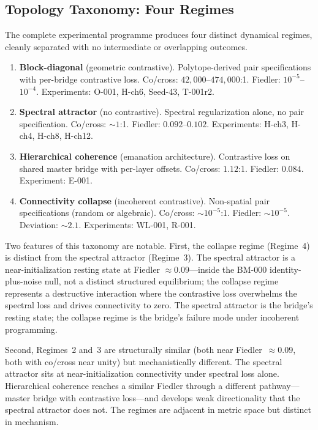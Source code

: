 \subsection{Topology Taxonomy: Four Regimes}

The complete experimental programme produces four distinct dynamical
regimes, cleanly separated with no intermediate or overlapping
outcomes.

\begin{enumerate}
  \item \textbf{Block-diagonal} (geometric contrastive).
    Polytope-derived pair specifications with per-bridge contrastive
    loss. Co/cross: $42{,}000$--$474{,}000$:1. Fiedler: $10^{-5}$--$10^{-4}$.
    Experiments: O-001, H-ch6, Seed-43, T-001r2.

  \item \textbf{Spectral attractor} (no contrastive).
    Spectral regularization alone, no pair specification.
    Co/cross: ${\sim}1$:1. Fiedler: $0.092$--$0.102$.
    Experiments: H-ch3, H-ch4, H-ch8, H-ch12.

  \item \textbf{Hierarchical coherence} (emanation architecture).
    Contrastive loss on shared master bridge with per-layer offsets.
    Co/cross: $1.12$:1. Fiedler: $0.084$.
    Experiment: E-001.

  \item \textbf{Connectivity collapse} (incoherent contrastive).
    Non-spatial pair specifications (random or algebraic).
    Co/cross: ${\sim}10^{-5}$:1. Fiedler: ${\sim}10^{-5}$.
    Deviation: ${\sim}2.1$.
    Experiments: WL-001, R-001.
\end{enumerate}

Two features of this taxonomy are notable. First, the collapse regime
(Regime~4) is distinct from the spectral attractor (Regime~3). The
spectral attractor is a near-initialization resting state at Fiedler
$\approx 0.09$---inside the BM-000 identity-plus-noise null, not a
distinct structured equilibrium; the collapse regime represents a
destructive interaction where the contrastive loss overwhelms the
spectral loss and drives connectivity to zero. The spectral attractor
is the bridge's resting state; the collapse regime is the bridge's
failure mode under incoherent programming.

Second, Regimes~2 and~3 are structurally similar (both near
Fiedler~$\approx 0.09$, both with co/cross near unity) but
mechanistically different. The spectral attractor sits at
near-initialization connectivity under spectral loss alone.
Hierarchical coherence reaches a similar Fiedler through a different
pathway---master bridge with contrastive loss---and develops weak
directionality that the spectral attractor does not. The regimes are adjacent in
metric space but distinct in mechanism.
